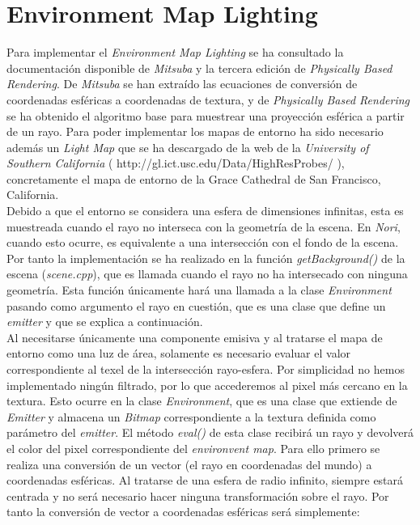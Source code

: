 \documentclass[10pt,oneside,a4paper]{article}
\begin{document}
\section{Environment Map Lighting}
Para implementar el \emph{Environment Map Lighting} se ha consultado la documentación disponible de \emph{Mitsuba} y la tercera edición de \emph{Physically Based Rendering}. De \emph{Mitsuba} se han extraído las ecuaciones de conversión de coordenadas esféricas a coordenadas de textura, y de \emph{Physically Based Rendering} se ha obtenido el algoritmo base para muestrear una proyección esférica a partir de un rayo. Para poder implementar los mapas de entorno ha sido necesario además un \emph{Light Map} que se ha descargado de la web de la \emph{University of Southern California} ( http://gl.ict.usc.edu/Data/HighResProbes/ ), concretamente el mapa de entorno de la Grace Cathedral de San Francisco, California.\\

Debido a que el entorno se considera una esfera de dimensiones infinitas, esta es muestreada cuando el rayo no interseca con la geometría de la escena. En \emph{Nori}, cuando esto ocurre, es equivalente a una intersección con el fondo de la escena. Por tanto la implementación se ha realizado en la función \emph{getBackground()} de la escena (\emph{scene.cpp}), que es llamada cuando el rayo no ha intersecado con ninguna geometría. Esta función únicamente hará una llamada a la clase \emph{Environment} pasando como argumento el rayo en cuestión, que es una clase que define un \emph{emitter} y que se explica a continuación.\\

Al necesitarse únicamente una componente emisiva y al tratarse el mapa de entorno como una luz de área, solamente es necesario evaluar el valor correspondiente al texel de la intersección rayo-esfera. Por simplicidad no hemos implementado ningún filtrado, por lo que accederemos al pixel más cercano en la textura. Esto ocurre en la clase \emph{Environment}, que es una clase que extiende de \emph{Emitter} y almacena un \emph{Bitmap} correspondiente a la textura definida como parámetro del \emph{emitter}. El método \emph{eval()} de esta clase recibirá un rayo y devolverá el color del pixel correspondiente del \emph{environvent map}. Para ello primero se realiza una conversión de un vector (el rayo en coordenadas del mundo) a coordenadas esféricas. Al tratarse de una esfera de radio infinito, siempre estará centrada y no será necesario hacer ninguna transformación sobre el rayo. Por tanto la conversión de vector a coordenadas esféricas será simplemente:
\end{document}
